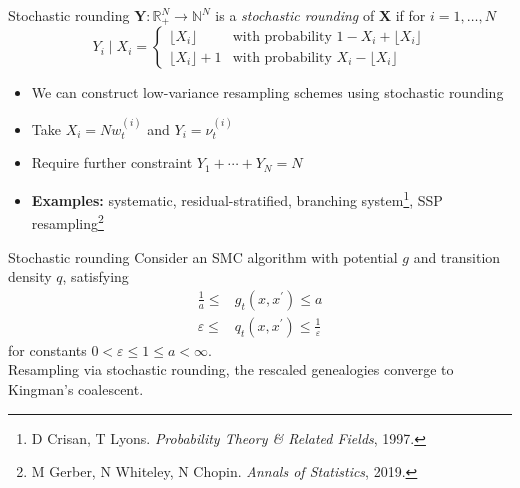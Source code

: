 \documentclass[aspectratio=169]{beamer}
\theoremstyle{definition}
\newcommand{\vt}[2][t]{\nu_{#1}^{(#2)}}
\newcommand{\wt}[2][t]{w_{#1}^{(#2)}}
\begin{document}
\begin{frame}{Stochastic rounding}
$\mathbf{Y}: \mathbb{R}_+^N \to \mathbb{N}^N$ is a \emph{stochastic rounding} of $\mathbf{X}$ if for $i=1,\dots,N$
\begin{equation*}
Y_i \mid X_i =
\begin{cases}
 \lfloor X_i \rfloor & \text{with probability } 1- X_i + \lfloor X_i \rfloor \\
  \lfloor X_i \rfloor +1 & \text{with probability } X_i - \lfloor X_i \rfloor 
\end{cases}
\end{equation*}
\pause
\begin{itemize}
\item We can construct low-variance resampling schemes using stochastic rounding
\item Take $X_i = N\wt{i}$ and $Y_i = \vt{i}$
\item Require further constraint $Y_1 + \cdots + Y_N = N$
\pause
\item \textbf{Examples:} systematic, residual-stratified, branching system\footnote{D Crisan, T Lyons. \textit{Probability Theory \& Related Fields}, 1997.}, SSP resampling\footnote{M Gerber, N Whiteley, N Chopin. \textit{Annals of Statistics}, 2019.}
\end{itemize}
\end{frame}


\begin{frame}{Stochastic rounding}
Consider an SMC algorithm with potential $g$ and transition density $q$, satisfying
\begin{align*}
\frac{1}{a} \leq &g_t(x, x^\prime) \leq a \\
\varepsilon \leq &q_t(x, x^\prime) \leq \frac{1}{\varepsilon}
\end{align*}
for constants $0<\varepsilon\leq 1\leq a<\infty$.\\[10pt]

Resampling via stochastic rounding, the rescaled genealogies converge to Kingman's coalescent.
\end{frame}
\end{document}

